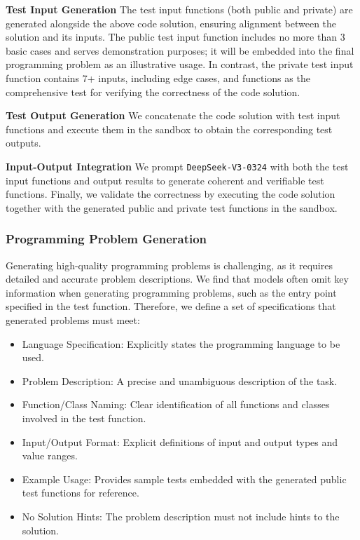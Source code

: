 \textbf{Test Input Generation} The test input functions (both public and private) are generated alongside the above code solution, ensuring alignment between the solution and its inputs. The public test input function includes no more than 3 basic cases and serves demonstration purposes; it will be embedded into the final programming problem as an illustrative usage. In contrast, the private test input function contains 7+ inputs, including edge cases, and functions as the comprehensive test for verifying the correctness of the code solution.

\textbf{Test Output Generation} We concatenate the code solution with test input functions and execute them in the sandbox to obtain the corresponding test outputs.

\textbf{Input-Output Integration} We prompt \texttt{DeepSeek-V3-0324} with both the test input functions and output results to generate coherent and verifiable test functions. Finally, we validate the correctness by executing the code solution together with the generated public and private test functions in the sandbox.

\subsubsection{Programming Problem Generation} 
\label{method_probelm_generate}

Generating high-quality programming problems is challenging, as it requires detailed and accurate problem descriptions. We find that models often omit key information when generating programming problems, such as the entry point specified in the test function. Therefore, we define a set of specifications that generated problems must meet:

\begin{itemize}
    \item Language Specification: Explicitly states the programming language to be used.
    \item Problem Description: A precise and unambiguous description of the task.
    \item Function/Class Naming: Clear identification of all functions and classes involved in the test function.
    \item Input/Output Format: Explicit definitions of input and output types and value ranges.
    \item Example Usage: Provides sample tests embedded with the generated public test functions for reference.
    \item No Solution Hints: The problem description must not include hints to the solution.
\end{itemize}


